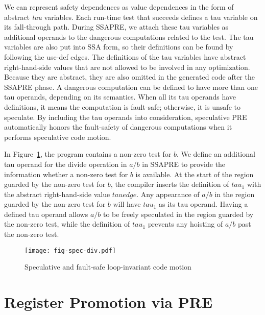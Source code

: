We can represent safety dependences as value dependences in the
form of abstract \emph{tau} variables.  Each run-time test
that succeeds defines a tau variable on its fall-through path.  During SSAPRE,
we attach these tau variables as additional operands to the
dangerous computations related to the test.  The tau variables are also 
put into SSA form, so their definitions can
be found by following the use-def edges.  The definitions of the tau variables 
have abstract right-hand-side values that are not allowed to be
involved in any optimization.  Because they are abstract, they
are also omitted in the generated code after the SSAPRE phase.  A dangerous
computation can be defined to have more than one tau operands, depending on
its semantics.  When all its tau operands have definitions, 
it means the computation is fault-safe; otherwise, it is unsafe to speculate.  
By including the tau operands into consideration, speculative PRE automatically
honors the fault-safety of dangerous computations when it performs speculative
code motion.

In Figure~\ref{fig:spec-div}, the program contains a 
non-zero test for $b$.  We define an additional tau operand
for the divide operation in $a/b$ in SSAPRE to
provide the information whether a non-zero test for $b$ is available.  
At the start of the region guarded by the non-zero test for $b$, the compiler
inserts the definition of $tau_1$ with the abstract right-hand-side value 
$tauedge$.  Any appearance of $a/b$ in the region guarded by
the non-zero test for $b$ will have $tau_1$ as its tau operand.  Having a
defined tau operand allows $a/b$ to be freely speculated in the region
guarded by the non-zero test, while the definition of $tau_1$ prevents any
hoisting of $a/b$ past the non-zero test.

\begin{figure}
\centering
\texttt{[image: fig-spec-div.pdf]}
\caption{Speculative and fault-safe loop-invariant code motion}
\label{fig:spec-div}
\end{figure}

\section{Register Promotion via PRE}

